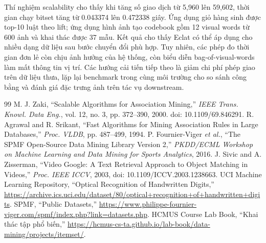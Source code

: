 \documentclass[conference,10pt]{IEEEtran}
\begin{document}
Thí nghiệm scalability cho thấy khi tăng số giao dịch từ 5,960 lên 59,602, thời gian chạy bitset tăng từ 0.043374 lên 0.472338 giây. Ứng dụng giỏ hàng sinh được top-10 luật theo lift; ứng dụng hình ảnh tạo codebook gồm 12 visual words từ 600 ảnh và khai thác được 37 mẫu. Kết quả cho thấy Eclat có thể áp dụng cho nhiều dạng dữ liệu sau bước chuyển đổi phù hợp. Tuy nhiên, các phép đo thời gian đơn lẻ còn chịu ảnh hưởng của hệ thống, còn biểu diễn bag-of-visual-words làm mất thông tin vị trí. Các hướng cải tiến tiếp theo là giảm chi phí phép giao trên dữ liệu thưa, lặp lại benchmark trong cùng môi trường cho so sánh công bằng và đánh giá đặc trưng ảnh trên tác vụ downstream.
\begin{thebibliography}{99}
 M. J. Zaki, ``Scalable Algorithms for Association Mining,'' \emph{IEEE Trans. Knowl. Data Eng.}, vol. 12, no. 3, pp. 372--390, 2000. doi: 10.1109/69.846291.
 R. Agrawal and R. Srikant, ``Fast Algorithms for Mining Association Rules in Large Databases,'' \emph{Proc. VLDB}, pp. 487--499, 1994.
 P. Fournier-Viger \emph{et al.}, ``The SPMF Open-Source Data Mining Library Version 2,'' \emph{PKDD/ECML Workshop on Machine Learning and Data Mining for Sports Analytics}, 2016.
 J. Sivic and A. Zisserman, ``Video Google: A Text Retrieval Approach to Object Matching in Videos,'' \emph{Proc. IEEE ICCV}, 2003, doi: 10.1109/ICCV.2003.1238663.
 UCI Machine Learning Repository, ``Optical Recognition of Handwritten Digits,'' \url{https://archive.ics.uci.edu/dataset/80/optical+recognition+of+handwritten+digits}.
 SPMF, ``Public Datasets,'' \url{https://www.philippe-fournier-viger.com/spmf/index.php?link=datasets.php}.
 HCMUS Course Lab Book, ``Khai thác tập phổ biến,'' \url{https://hcmus-cs-ta.github.io/lab-book/data-mining/projects/itemset/}.
\end{thebibliography}
\end{document}
